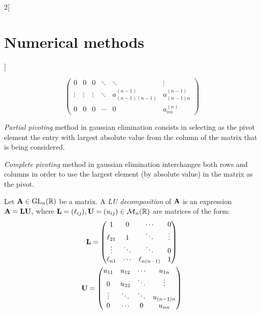 \documentclass[../../../main.tex]{subfiles}
\begin{document}
\begin{multicols}{2}[\section{Numerical methods}]
\begin{method}
$$\begin{pmatrix}
        0            & 0            & 0            & \ddots       & \ddots                 & \vdots             \\
        \vdots       & \vdots       & \vdots       & \ddots       & a_{(n-1)(n-1)}^{(n-1)} & a_{(n-1)n}^{(n-1)} \\
        0            & 0            & 0            & \cdots       & 0                      & a_{nn}^{(n)}
      \end{pmatrix}
    $$
  \end{method}
  \begin{method}
    \emph{Partial pivoting} method in gaussian elimination consists in selecting as the pivot element the entry with largest absolute value from the column of the matrix that is being considered.
  \end{method}
  \begin{method}
    \emph{Complete pivoting} method in gaussian elimination interchanges both rows and columns in order to use the largest element (by absolute value) in the matrix as the pivot.
  \end{method}
  \begin{definition}[LU descompostion]
    Let $\boldsymbol{\mathrm{A}}\in\mathrm{GL}_n(\mathbb{R})$ be a matrix. A \emph{LU decomposition} of $\boldsymbol{\mathrm{A}}$ is an expression $\boldsymbol{\mathrm{A}}=\boldsymbol{\mathrm{L}}\boldsymbol{\mathrm{U}}$, where $\boldsymbol{\mathrm{L}}=(\ell_{ij}),\boldsymbol{\mathrm{U}}=(u_{ij})\in\mathcal{M}_n(\mathbb{R})$ are matrices of the form:
    \begin{gather}\label{NM_L}
      \boldsymbol{\mathrm{L}}=
      \begin{pmatrix}
        1         & 0      & \cdots        & 0      \\
        \ell_{21} & 1      & \ddots        & \vdots \\
        \vdots    & \ddots & \ddots        & 0      \\
        \ell_{n1} & \cdots & \ell_{n(n-1)} & 1
      \end{pmatrix}\\\label{NM_U}
      \boldsymbol{\mathrm{U}}=
      \begin{pmatrix}
        u_{11} & u_{12} & \cdots & u_{1n}     \\
        0      & u_{22} & \ddots & \vdots     \\
        \vdots & \ddots & \ddots & u_{(n-1)n} \\
        0      & \cdots & 0      & u_{nn}
      \end{pmatrix}
    \end{gather}
  \end{definition}
  \begin{lemma}

\end{lemma}
\end{multicols}
\end{document}
